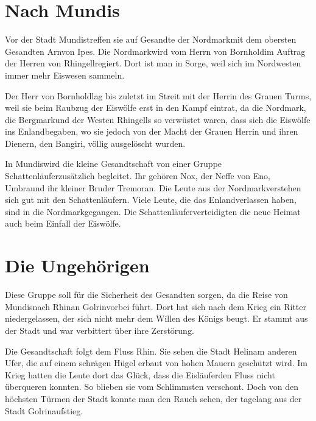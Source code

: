 \documentclass[12pt,a4paper,onecolumn,twoside,ngerman]{book}
\newcommand{\Bangiri}{Bangiri}
\newcommand{\Enland}{Enland}
\newcommand{\Schattenlaufer}{Schattenläufer}
\newcommand{\Eno}{Eno}
\newcommand{\Nox}{Nox}
\newcommand{\Umbra}{Umbra}
\newcommand{\Tremor}{Tremor}
\newcommand{\Nordmark}{Nordmark}
\newcommand{\Bergmark}{Bergmark}
\newcommand{\Ipes}{Ipes}
\newcommand{\Bornhold}{Bornhold}
\newcommand{\Arn}{Arn}
\newcommand{\Eislaufer}{Eisläufer}
\newcommand{\Rhingell}{Rhingell}
\newcommand{\Mundis}{Mundis}
\newcommand{\Helin}{Helin}
\newcommand{\Golrin}{Golrin}
\newcommand{\Rhin}{Rhin}
\begin{document}

\section{Nach \Mundis}
Vor der Stadt \Mundis treffen sie auf Gesandte der \Nordmark mit dem obersten Gesandten \Arn von \Ipes{.} Die \Nordmark wird vom Herrn von \Bornhold im Auftrag der Herren von \Rhingell regiert. Dort ist man in Sorge, weil sich im Nordwesten immer mehr Eiswesen sammeln.

Der Herr von \Bornhold lag bis zuletzt im Streit mit der Herrin des Grauen Turms, weil sie beim Raubzug der Eiswölfe erst in den Kampf  eintrat, da die \Nordmark, die \Bergmark und der Westen \Rhingell{s} so verwüstet waren, dass sich die Eiswölfe ins \Enland begaben, wo sie jedoch von der Macht der Grauen Herrin und ihren Dienern, den \Bangiri, völlig ausgelöscht wurden. 

In \Mundis wird die kleine Gesandtschaft von einer Gruppe \Schattenlaufer zusätzlich begleitet. Ihr gehören \Nox, der Neffe von \Eno, \Umbra und ihr kleiner Bruder \Tremor an. Die Leute aus der \Nordmark verstehen sich gut mit den \Schattenlaufer{n}. Viele Leute, die das \Enland verlassen haben, sind in die \Nordmark gegangen. Die \Schattenlaufer verteidigten die neue Heimat auch beim Einfall der Eiswölfe. 

\section{Die Ungehörigen}

Diese Gruppe soll für die Sicherheit des Gesandten sorgen, da die Reise von \Mundis nach \Rhin an \Golrin vorbei führt. Dort hat sich nach dem Krieg ein Ritter niedergelassen, der sich nicht mehr dem Willen des Königs beugt. Er stammt aus der Stadt und war verbittert über ihre Zerstörung.

Die Gesandtschaft folgt dem Fluss \Rhin . Sie sehen die Stadt \Helin am anderen Ufer, die auf einem schrägen Hügel erbaut von hohen Mauern geschützt wird. Im Krieg hatten die Leute dort das Glück, dass die \Eislaufer den Fluss nicht überqueren konnten. So blieben sie vom Schlimmsten verschont. Doch von den höchsten Türmen der Stadt konnte man den Rauch sehen, der tagelang aus der Stadt \Golrin aufstieg.
\end{document}
